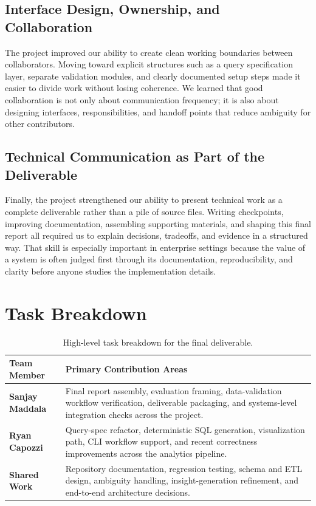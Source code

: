 \documentclass[11pt]{article}
\begin{document}
\subsection{Interface Design, Ownership, and Collaboration}
The project improved our ability to create clean working boundaries between collaborators. Moving toward explicit structures such as a query specification layer, separate validation modules, and clearly documented setup steps made it easier to divide work without losing coherence. We learned that good collaboration is not only about communication frequency; it is also about designing interfaces, responsibilities, and handoff points that reduce ambiguity for other contributors.

\subsection{Technical Communication as Part of the Deliverable}
Finally, the project strengthened our ability to present technical work as a complete deliverable rather than a pile of source files. Writing checkpoints, improving documentation, assembling supporting materials, and shaping this final report all required us to explain decisions, tradeoffs, and evidence in a structured way. That skill is especially important in enterprise settings because the value of a system is often judged first through its documentation, reproducibility, and clarity before anyone studies the implementation details.

\section{Task Breakdown}
\begin{table}[H]
    \centering
    \caption{High-level task breakdown for the final deliverable.}
    \label{tab:task-breakdown}
    \begin{tabularx}{\textwidth}{@{}>{\bfseries}p{}X@{}}
        \toprule
        Team Member & Primary Contribution Areas \\
        \midrule
        Sanjay Maddala & Final report assembly, evaluation framing, data-validation workflow verification, deliverable packaging, and systems-level integration checks across the project. \\
        Ryan Capozzi & Query-spec refactor, deterministic SQL generation, visualization path, CLI workflow support, and recent correctness improvements across the analytics pipeline. \\
        Shared Work & Repository documentation, regression testing, schema and ETL design, ambiguity handling, insight-generation refinement, and end-to-end architecture decisions. \\
        \bottomrule
    \end{tabularx}
\end{table}
\end{document}
